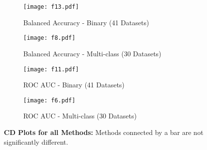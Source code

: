 \documentclass[11pt]{article}
\newcommand{\nbc}[3]{
		{\colorbox{#3}{\bfseries\sffamily\scriptsize\textcolor{white}{#1}}}
		{\textcolor{#3}{\sf\small$\blacktriangleright$\textit{#2}$\blacktriangleleft$}}
}
\newcommand{\changed}[1]{\nbc{CHANGED}{#1}{changedcolor}}
\renewcommand{\changed}[1]{{\color{changedcolor}#1}}
\renewcommand{\changed}[1]{{#1}}
\begin{document}
\begin{figure}
    \begin{subfigure}[t]{0.49\linewidth}
        \centering 
        \texttt{[image: f13.pdf]}
        \caption{Balanced Accuracy - Binary (41 Datasets)}
    \end{subfigure}
    \begin{subfigure}[t]{0.49\linewidth}
        \centering
        \texttt{[image: f8.pdf]}
        \caption{Balanced Accuracy - Multi-class (30 Datasets)}
    \end{subfigure}
    \begin{subfigure}[t]{0.49\linewidth}
        \centering
        \texttt{[image: f11.pdf]}
        \caption{ROC AUC - Binary (41 \changed{Datasets})}
    \end{subfigure}
    \begin{subfigure}[t]{0.49\linewidth}
        \centering
        \texttt{[image: f6.pdf]}
        \caption{ROC AUC - Multi-class (30 \changed{Datasets})}
    \end{subfigure}

  
    \caption{\textbf{CD Plots for all Methods:}
    {\normalfont Methods connected by a bar are not significantly different.}
    }
    \label{fig/cd_plot_f}
\end{figure}
\end{document}
